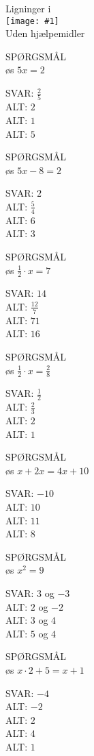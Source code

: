 \documentclass[]{article}
\newenvironment{question}[2]{SPØRGSMÅL\\}{\hspace{50px}}
\newcommand{\name}[1]{{\huge #1}\\}
\newcommand{\tag}[1]{#1}
\newcommand{\cover}[1]{\texttt{[image: \#1]}\\}
\newcommand{\answer}[1]{{\color{green} SVAR: #1}\\}
\newcommand{\alt}[1]{{\color{red} ALT: #1}\\}
\begin{document}
\name{Ligninger i}
\cover{ligning1.png}
\tag{Uden hjælpemidler}

\begin{question}{multi}
    
Løs $5x=2$

\answer{$\frac{2}{5}$}
\alt{$2$}
\alt{$1$}
\alt{$5$}

\end{question}

\begin{question}{multi}
    
    Løs $5x-8=2$
    
    \answer{$2$}
    \alt{$\frac{5}{4}$}
    \alt{$6$}
    \alt{$3$}
    
\end{question}

\begin{question}{multi}
    
    Løs $\frac{1}{2} \cdot x=7$
    
    \answer{$14$}
    \alt{$\frac{12}{7}$}
    \alt{$71$}
    \alt{$16$}
    
\end{question}

\begin{question}{multi}
    
    Løs $\frac{1}{2} \cdot x=\frac{2}{8}$
    
    \answer{$\frac{1}{2}$}
    \alt{$\frac{2}{3}$}
    \alt{$2$}
    \alt{$1$}
    
\end{question}

\begin{question}{multi}
    
    Løs $x + 2x = 4x + 10$
    
    \answer{$-10$}
    \alt{$10$}
    \alt{$11$}
    \alt{$8$}
    
\end{question}

\begin{question}{multi}
    
    Løs $x^2=9$
    
    \answer{$3$ og $-3$}
    \alt{$2$ og $-2$}
    \alt{$3$ og $4$}
    \alt{$5$ og $4$}
    
\end{question}

\begin{question}{multi}
    
    Løs $x\cdot 2+5=x+1$
    
    \answer{$-4$}
    \alt{$-2$}
    \alt{$2$}
    \alt{$4$}
    \alt{$1$}
    
\end{question}
\end{document}
